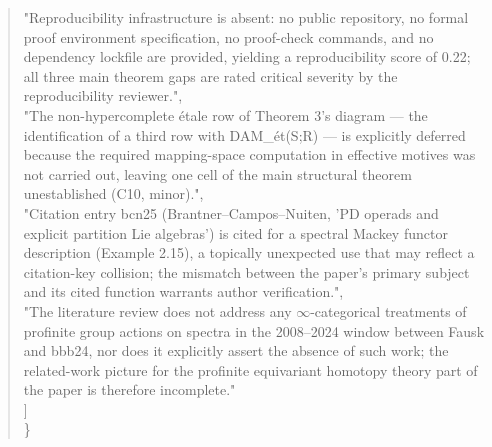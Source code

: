 \documentclass[11pt]{article}
\begin{document}
\begin{quote}
    "Reproducibility infrastructure is absent: no public repository, no formal proof environment specification, no proof-check commands, and no dependency lockfile are provided, yielding a reproducibility score of 0.22; all three main theorem gaps are rated critical severity by the reproducibility reviewer.",\\
    "The non-hypercomplete étale row of Theorem 3's diagram --- the identification of a third row with DAM\_ét(S;R) --- is explicitly deferred because the required mapping-space computation in effective motives was not carried out, leaving one cell of the main structural theorem unestablished (C10, minor).",\\
    "Citation entry bcn25 (Brantner--Campos--Nuiten, 'PD operads and explicit partition Lie algebras') is cited for a spectral Mackey functor description (Example 2.15), a topically unexpected use that may reflect a citation-key collision; the mismatch between the paper's primary subject and its cited function warrants author verification.",\\
    "The literature review does not address any \ensuremath{\infty}-categorical treatments of profinite group actions on spectra in the 2008--2024 window between Fausk and bbb24, nor does it explicitly assert the absence of such work; the related-work picture for the profinite equivariant homotopy theory part of the paper is therefore incomplete."\\
  ]\\
\}\\
\end{quote}
\end{document}
